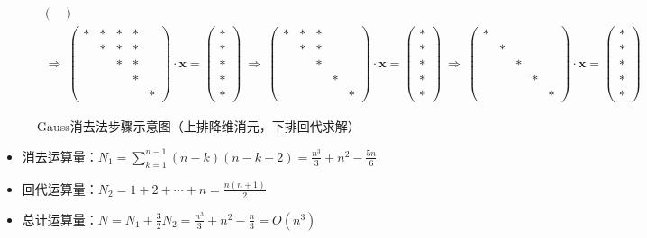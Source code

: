\begin{figure}[htbp]
\begin{align*}
\begin{pmatrix}
\end{pmatrix}\\[0.5ex]\scriptstyle
{\displaystyle\ \Rightarrow\ }
\begin{pmatrix}
\ast & \ast & \ast & \ast &      \\
     & \ast & \ast & \ast &      \\
     &      & \ast & \ast &      \\
     &      &      & \ast &      \\
     &      &      &      & \ast
\end{pmatrix}
\cdot \mathbf{\displaystyle x =}
\begin{pmatrix}
\ast \\ \ast \\ \ast \\ \ast \\ \ast
\end{pmatrix}
{\displaystyle\ \Rightarrow\ }
\begin{pmatrix}
\ast & \ast & \ast &      &      \\
     & \ast & \ast &      &      \\
     &      & \ast &      &      \\
     &      &      & \ast &      \\
     &      &      &      & \ast
\end{pmatrix}
\cdot \mathbf{\displaystyle x =}
\begin{pmatrix}
\ast \\ \ast \\ \ast \\ \ast \\ \ast
\end{pmatrix}
{\displaystyle\ \Rightarrow\ }
\begin{pmatrix}
\ast &      &      &      &      \\
     & \ast &      &      &      \\
     &      & \ast &      &      \\
     &      &      & \ast &      \\
     &      &      &      & \ast
\end{pmatrix}
\cdot \mathbf{\displaystyle x =}
\begin{pmatrix}
\ast \\ \ast \\ \ast \\ \ast \\ \ast
\end{pmatrix}
\end{align*}
\caption{Gauss消去法步骤示意图（上排降维消元，下排回代求解）}\label{2-f1}
\end{figure}
\begin{itemize}\tl
\item 消去运算量：$N_1=\sum\limits_{k=1}^{n-1}(n-k)(n-k+2)=\frac{n^3}3+n^2-\frac{5n}6$
\item 回代运算量：$N_2=1+2+\cdots+n=\frac{n(n+1)}2$
\item 总计运算量：$N=N_1+\frac32N_2=\frac{n^3}3+n^2-\frac n3=O(n^3)$
\end{itemize}

